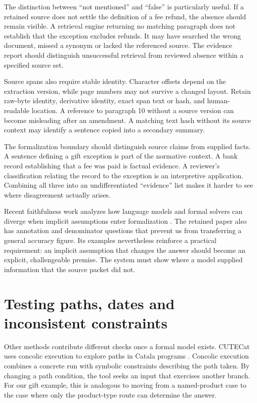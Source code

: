 \documentclass[12pt,a4paper,oneside,openany]{book}
\begin{document}
The distinction between ``not mentioned'' and ``false'' is particularly useful.
If a retained source does not settle the definition of a fee refund, the
absence should remain visible. A retrieval engine returning no matching
paragraph does not establish that the exception excludes refunds. It may have
searched the wrong document, missed a synonym or lacked the referenced source.
The evidence report should distinguish unsuccessful retrieval from reviewed
absence within a specified source set.

Source spans also require stable identity. Character offsets depend on the
extraction version, while page numbers may not survive a changed layout.
Retain raw-byte identity, derivative identity, exact span text or hash, and
human-readable location. A reference to paragraph 10 without a source version
can become misleading after an amendment. A matching text hash without its
source context may identify a sentence copied into a secondary summary.

The formalization boundary should distinguish source claims from supplied
facts. A sentence defining a gift exception is part of the normative context.
A bank record establishing that a fee was paid is factual evidence. A
reviewer's classification relating the record to the exception is an
interpretive application. Combining all three into an undifferentiated
``evidence'' list makes it harder to see where disagreement actually arises.

Recent faithfulness work analyzes how language models and formal solvers can
diverge when implicit assumptions enter formalization \citep{limits2026}.
The retained paper also has annotation and denominator questions that prevent
us from transferring a general accuracy figure. Its examples nevertheless
reinforce a practical requirement: an implicit assumption that changes the
answer should become an explicit, challengeable premise. The system must
show where a model supplied information that the source packet did not.

\section{Testing paths, dates and inconsistent constraints}
\label{merge:M04:13}

\label{sec:languages-analysis}
Other methods contribute different checks once a formal model exists.
CUTECat uses concolic execution to explore paths in Catala programs
\citep[secs.~2--5]{cutecat2025}. Concolic execution combines a concrete run
with symbolic constraints describing the path taken. By changing a path
condition, the tool seeks an input that exercises another branch. For our
gift example, this is analogous to moving from a named-product case to the
case where only the product-type route can determine the answer.
\end{document}
